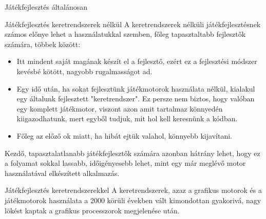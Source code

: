 \begin{MyChapter}{Játékfejlesztés általánosan}
	\begin{MySection}{Játékfejlesztés keretrendszerek nélkül}
		A keretrendszerek nélküli játékfejlesztésnek számos előnye lehet a használatukkal szemben, főleg tapasztaltabb fejlesztők számára, többek között:
		\begin{itemize}
			\item Itt mindent saját magának készít el a fejlesztő, ezért ez a fejlesztési módszer kevésbé kötött, nagyobb rugalmasságot ad.
			\item Egy idő után, ha sokat fejlesztünk játékmotorok használata nélkül, kialakul egy általunk fejlesztett "keretrendszer". Ez persze nem biztos, hogy valóban egy komplett játékmotor, viszont azon amit tartalmaz könnyedén kiigazodhatunk, mert egyből tudjuk, mit hol kell keresnünk a kódban.
			\item Főleg az előző ok miatt, ha hibát ejtük valahol, könnyebb kijavítani.
		\end{itemize}
		Kezdő, tapasztalatlanabb játékfejlesztők számára azonban hátrány lehet, hogy ez a folyamat sokkal lassabb, időigényesebb lehet, mint egy már meglévő motor használatával elkészített alkalmazás.
	\end{MySection}

	\begin{MySection}{Játékfejlesztés keretrendszerekkel}
		A keretrendszerek, azaz a grafikus motorok és a játékmotorok használata a 2000 körüli években vált kimondottan gyakorivá, nagy lökést kaptak a grafikus processzorok megjelenése után.
		

\end{MySection}
\end{MyChapter}

